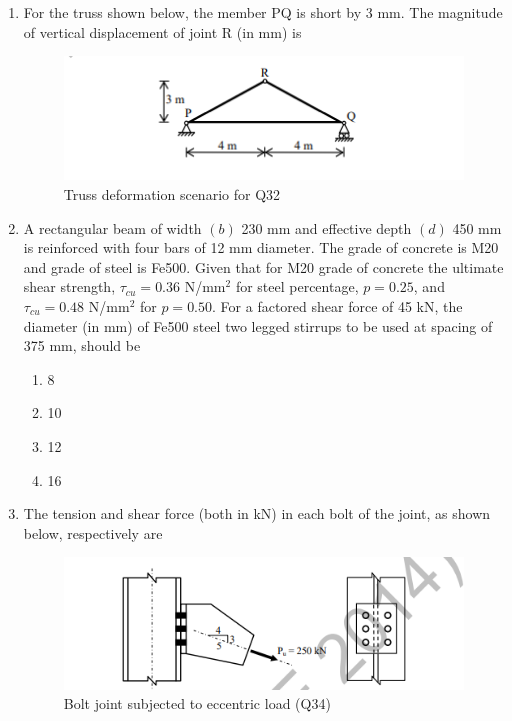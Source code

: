 \documentclass[journal,12pt,onecolumn]{IEEEtran}
\theoremstyle{remark}
\begin{document}
\begin{enumerate}
\item For the truss shown below, the member PQ is short by 3 mm. The magnitude of vertical displacement of joint R (in mm) is \hfill{}

\begin{figure}[H]
\centering
\includegraphics[width=0.7\linewidth]{figs/image11.png}
\caption{Truss deformation scenario for Q32}
\label{fig:q32}
\end{figure}






\item A rectangular beam of width $(b)$ 230 mm and effective depth $(d)$ 450 mm is reinforced with four bars of 12 mm diameter. The grade of concrete is M20 and grade of steel is Fe500. Given that for M20 grade of concrete the ultimate shear strength, $\tau_{cu} = 0.36$ N/mm$^2$ for steel percentage, $p = 0.25$, and $\tau_{cu} = 0.48$ N/mm$^2$ for $p = 0.50$. For a factored shear force of 45 kN, the diameter (in mm) of Fe500 steel two legged stirrups to be used at spacing of 375 mm, should be \hfill{}

\begin{multicols}{4}
\begin{enumerate}
\item 8
\item 10
\item 12
\item 16
\end{enumerate}
\end{multicols}

\item The tension and shear force (both in kN) in each bolt of the joint, as shown below, respectively are \hfill{}

\begin{figure}[H]
\centering
\includegraphics[width=0.7\linewidth]{figs/image12.png}
\caption{Bolt joint subjected to eccentric load (Q34)}
\label{fig:q34}
\end{figure}


\end{enumerate}
\end{document}
